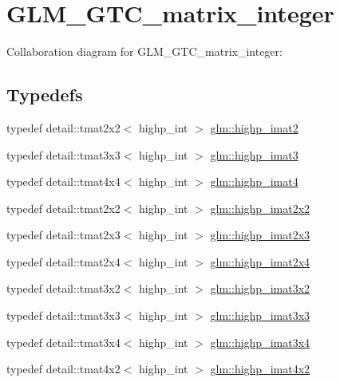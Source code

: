\hypertarget{group__gtc__matrix__integer}{}\section{G\+L\+M\+\_\+\+G\+T\+C\+\_\+matrix\+\_\+integer}
\label{group__gtc__matrix__integer}
Collaboration diagram for G\+L\+M\+\_\+\+G\+T\+C\+\_\+matrix\+\_\+integer\+:
\subsection*{Typedefs}
\begin{DoxyCompactItemize}
\item 
typedef detail\+::tmat2x2$<$ highp\+\_\+int $>$ \hyperlink{group__gtc__matrix__integer_ga83bfb0be8d0a12b7c5e7c4af0eb9f828}{glm\+::highp\+\_\+imat2}
\item 
typedef detail\+::tmat3x3$<$ highp\+\_\+int $>$ \hyperlink{group__gtc__matrix__integer_gab7c4db50bdedef67e45ce7d4ae68e567}{glm\+::highp\+\_\+imat3}
\item 
typedef detail\+::tmat4x4$<$ highp\+\_\+int $>$ \hyperlink{group__gtc__matrix__integer_ga59980867b7f2a7ec595fbb283a555d4c}{glm\+::highp\+\_\+imat4}
\item 
typedef detail\+::tmat2x2$<$ highp\+\_\+int $>$ \hyperlink{group__gtc__matrix__integer_ga5cd1cd0f7e30ec150285e6cf28d75975}{glm\+::highp\+\_\+imat2x2}
\item 
typedef detail\+::tmat2x3$<$ highp\+\_\+int $>$ \hyperlink{group__gtc__matrix__integer_ga06f89e9faac42bc0ac6628e83244a488}{glm\+::highp\+\_\+imat2x3}
\item 
typedef detail\+::tmat2x4$<$ highp\+\_\+int $>$ \hyperlink{group__gtc__matrix__integer_gaf9ce65229f4b8fe1e956b83ca82cdfa7}{glm\+::highp\+\_\+imat2x4}
\item 
typedef detail\+::tmat3x2$<$ highp\+\_\+int $>$ \hyperlink{group__gtc__matrix__integer_gab33e4ccf70f2e1f2eae7c6ddfb594e3c}{glm\+::highp\+\_\+imat3x2}
\item 
typedef detail\+::tmat3x3$<$ highp\+\_\+int $>$ \hyperlink{group__gtc__matrix__integer_gaf44e40dda4b36c90b4a9210e7b936c93}{glm\+::highp\+\_\+imat3x3}
\item 
typedef detail\+::tmat3x4$<$ highp\+\_\+int $>$ \hyperlink{group__gtc__matrix__integer_gab0609d65fae60184ade419c6e4edc812}{glm\+::highp\+\_\+imat3x4}
\item 
typedef detail\+::tmat4x2$<$ highp\+\_\+int $>$ \hyperlink{group__gtc__matrix__integer_gaf7ffcc749993239f1871f1acd8b06cca}{glm\+::highp\+\_\+imat4x2}

\end{DoxyCompactItemize}
